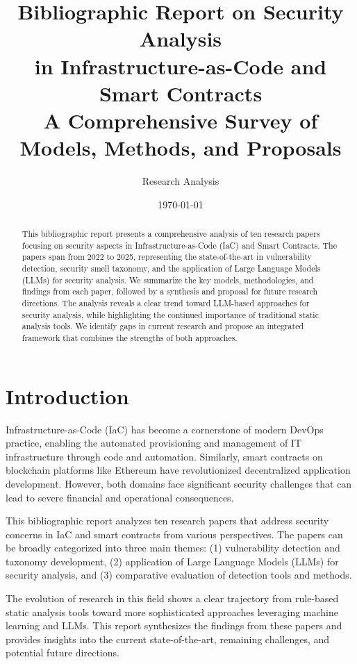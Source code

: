 \documentclass[11pt,a4paper]{article}
\title{\textbf{Bibliographic Report on Security Analysis\\in Infrastructure-as-Code and Smart Contracts}\\[0.5em]
\large A Comprehensive Survey of Models, Methods, and Proposals}
\author{Research Analysis}
\date{\today}
\begin{document}
\maketitle

\begin{abstract}
This bibliographic report presents a comprehensive analysis of ten research papers focusing on security aspects in Infrastructure-as-Code (IaC) and Smart Contracts. The papers span from 2022 to 2025, representing the state-of-the-art in vulnerability detection, security smell taxonomy, and the application of Large Language Models (LLMs) for security analysis. We summarize the key models, methodologies, and findings from each paper, followed by a synthesis and proposal for future research directions. The analysis reveals a clear trend toward LLM-based approaches for security analysis, while highlighting the continued importance of traditional static analysis tools. We identify gaps in current research and propose an integrated framework that combines the strengths of both approaches.
\end{abstract}

\tableofcontents
\newpage

\section{Introduction}

Infrastructure-as-Code (IaC) has become a cornerstone of modern DevOps practice, enabling the automated provisioning and management of IT infrastructure through code and automation. Similarly, smart contracts on blockchain platforms like Ethereum have revolutionized decentralized application development. However, both domains face significant security challenges that can lead to severe financial and operational consequences.

This bibliographic report analyzes ten research papers that address security concerns in IaC and smart contracts from various perspectives. The papers can be broadly categorized into three main themes: (1) vulnerability detection and taxonomy development, (2) application of Large Language Models (LLMs) for security analysis, and (3) comparative evaluation of detection tools and methods.

The evolution of research in this field shows a clear trajectory from rule-based static analysis tools toward more sophisticated approaches leveraging machine learning and LLMs. This report synthesizes the findings from these papers and provides insights into the current state-of-the-art, remaining challenges, and potential future directions.
\end{document}

